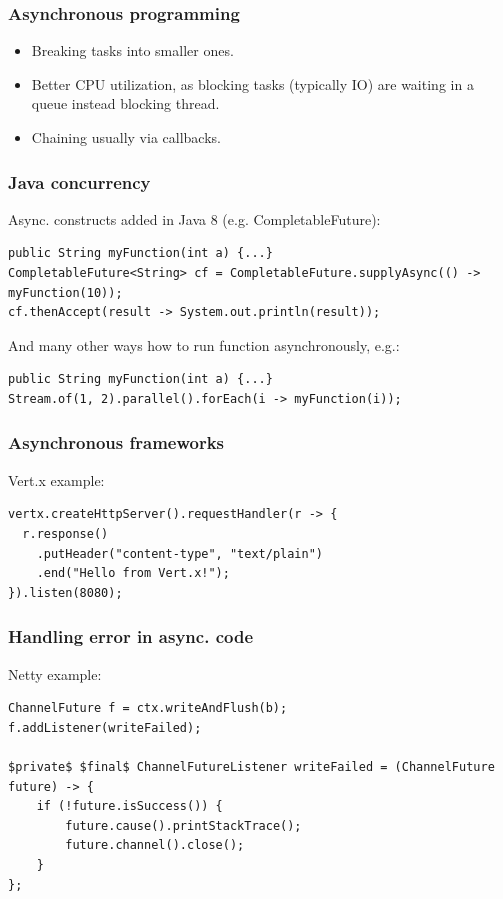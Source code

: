 \documentclass[10pt,utf8]{beamer}
\begin{document}
\begin{frame}
    \frametitle{Asynchronous programming}
    \begin{itemize}
        \item Breaking tasks into smaller ones.
        \item Better CPU utilization, as blocking tasks (typically IO) are waiting in a queue instead blocking thread.
        \item Chaining usually via callbacks.
    \end{itemize}
\end{frame}

\begin{frame}[fragile]
    \frametitle{Java concurrency}
    Async. constructs added in Java 8 (e.g. CompletableFuture):
    \begin{lstlisting}[style=java]
public String myFunction(int a) {...}
CompletableFuture<String> cf = CompletableFuture.supplyAsync(() -> myFunction(10));
cf.thenAccept(result -> System.out.println(result));
    \end{lstlisting}
And many other ways how to run function asynchronously, e.g.:
    \begin{lstlisting}[style=java]
public String myFunction(int a) {...}
Stream.of(1, 2).parallel().forEach(i -> myFunction(i));
    \end{lstlisting}
\end{frame}

\begin{frame}[fragile]
    \frametitle{Asynchronous frameworks}

    \vspace{0.5cm}

Vert.x example:
    \begin{lstlisting}[style=java]
vertx.createHttpServer().requestHandler(r -> {
  r.response()
    .putHeader("content-type", "text/plain")
    .end("Hello from Vert.x!");
}).listen(8080);
    \end{lstlisting}
\end{frame}

\begin{frame}[fragile]
    \frametitle{Handling error in async. code}
Netty example:
    \begin{lstlisting}[style=java]
ChannelFuture f = ctx.writeAndFlush(b);
f.addListener(writeFailed);

$private$ $final$ ChannelFutureListener writeFailed = (ChannelFuture future) -> {
    if (!future.isSuccess()) {
        future.cause().printStackTrace();
        future.channel().close();
    }
};
    \end{lstlisting}
\end{frame}
\end{document}
